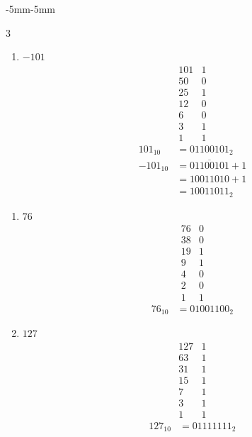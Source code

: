 \begin{changemargin}{-5mm}{-5mm}
\begin{multicols}{3}
\begin{enumerate}
  \item[\textsf{(e)}] \(-101\)
  \[
  \begin{array}{r|l}
    101 & 1\\
     50 & 0\\
     25 & 1\\
     12 & 0\\
      6 & 0\\
      3 & 1\\
      1 & 1
  \end{array}
  \]
  \begin{align*}
    101_{10} &= 01100101_2\\
   -101_{10} &= \overline{01100101} + 1\\
            &= 10011010 + 1\\
            &= 10011011_2
  \end{align*}
\end{enumerate}

\par\vfill\columnbreak

\begin{enumerate}

  \item[\textsf{(c)}] \(76\)
  \[
  \begin{array}{r|l}
    76 & 0\\
    38 & 0\\
    19 & 1\\
    9  & 1\\
    4  & 0\\
    2  & 0\\
    1  & 1
  \end{array}
  \]
  \begin{align*}76_{10}&=01001100_2\end{align*}

  \item[\textsf{(f)}] \(127\)
  \[
  \begin{array}{r|l}
    127 & 1\\
     63 & 1\\
     31 & 1\\
     15 & 1\\
      7 & 1\\
      3 & 1\\
      1 & 1
  \end{array}
  \]
  \begin{align*}127_{10} &= 01111111_2\end{align*}
\end{enumerate}

\end{multicols}
\end{changemargin}

